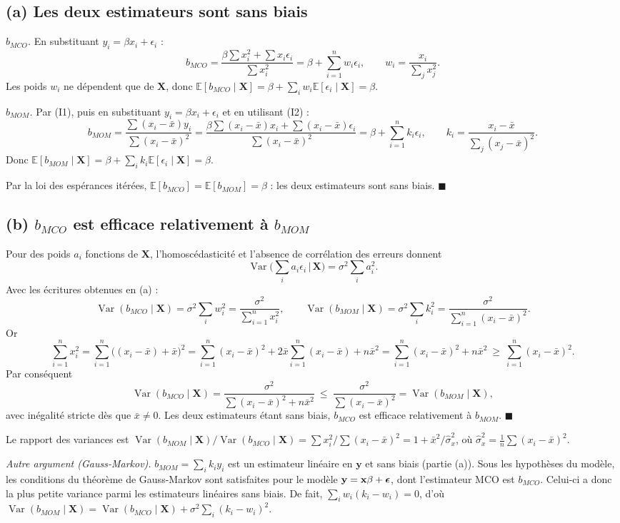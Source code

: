 \documentclass[11pt,a4paper]{article}
\newcommand{\vy}{\mathbf{y}}\newcommand{\vX}{\mathbf{X}}\newcommand{\vZ}{\mathbf{Z}}
\newcommand{\vx}{\mathbf{x}}\newcommand{\ve}{\mathbf{e}}\newcommand{\vb}{\mathbf{b}}
\newcommand{\E}{\mathbb{E}}\newcommand{\Var}{\operatorname{Var}}\newcommand{\Cov}{\operatorname{Cov}}
\newcommand{\sumi}{\sum_{i=1}^{n}}
\begin{document}
\subsection*{(a) Les deux estimateurs sont sans biais}

\textit{$b_{MCO}$.} En substituant $y_i=\beta x_i+\epsilon_i$ :
\[
b_{MCO}=\frac{\beta\sum x_i^2+\sum x_i\epsilon_i}{\sum x_i^2}=\beta+\sumi w_i\epsilon_i,\qquad w_i=\frac{x_i}{\sum_j x_j^2}.
\]
Les poids $w_i$ ne dépendent que de $\vX$, donc $\E[b_{MCO}\mid\vX]=\beta+\sum_i w_i\E[\epsilon_i\mid\vX]=\beta$.

\textit{$b_{MOM}$.} Par (I1), puis en substituant $y_i=\beta x_i+\epsilon_i$ et en utilisant (I2) :
\[
b_{MOM}=\frac{\sum(x_i-\bar x)y_i}{\sum(x_i-\bar x)^2}=\frac{\beta\sum(x_i-\bar x)x_i+\sum(x_i-\bar x)\epsilon_i}{\sum(x_i-\bar x)^2}=\beta+\sumi k_i\epsilon_i,\qquad k_i=\frac{x_i-\bar x}{\sum_j(x_j-\bar x)^2}.
\]
Donc $\E[b_{MOM}\mid\vX]=\beta+\sum_i k_i\E[\epsilon_i\mid\vX]=\beta$.

Par la loi des espérances itérées, $\E[b_{MCO}]=\E[b_{MOM}]=\beta$ : les deux estimateurs sont sans biais. $\blacksquare$

\subsection*{(b) $b_{MCO}$ est efficace relativement à $b_{MOM}$}

Pour des poids $a_i$ fonctions de $\vX$, l'homoscédasticité et l'absence de corrélation des erreurs donnent
\[
\Var\Big(\sum_i a_i\epsilon_i\,\Big|\,\vX\Big)=\sigma^2\sum_i a_i^2 .
\]
Avec les écritures obtenues en (a) :
\[
\Var(b_{MCO}\mid\vX)=\sigma^2\sum_i w_i^2=\frac{\sigma^2}{\sumi x_i^2},\qquad
\Var(b_{MOM}\mid\vX)=\sigma^2\sum_i k_i^2=\frac{\sigma^2}{\sumi(x_i-\bar x)^2}.
\]
Or
\[
\sumi x_i^2=\sumi\big((x_i-\bar x)+\bar x\big)^2=\sumi(x_i-\bar x)^2+2\bar x\sumi(x_i-\bar x)+n\bar x^2=\sumi(x_i-\bar x)^2+n\bar x^2\ \ge\ \sumi(x_i-\bar x)^2 .
\]
Par conséquent
\[
\Var(b_{MCO}\mid\vX)=\frac{\sigma^2}{\sum(x_i-\bar x)^2+n\bar x^2}\ \le\ \frac{\sigma^2}{\sum(x_i-\bar x)^2}=\Var(b_{MOM}\mid\vX),
\]
avec inégalité stricte dès que $\bar x\ne0$. Les deux estimateurs étant sans biais, $b_{MCO}$ est efficace relativement à $b_{MOM}$. $\blacksquare$

Le rapport des variances est $\Var(b_{MOM}\mid\vX)/\Var(b_{MCO}\mid\vX)=\sum x_i^2/\sum(x_i-\bar x)^2=1+\bar x^2/\hat\sigma_x^2$, où $\hat\sigma_x^2=\frac1n\sum(x_i-\bar x)^2$.

\textit{Autre argument (Gauss-Markov).} $b_{MOM}=\sum_i k_iy_i$ est un estimateur linéaire en $\vy$ et sans biais (partie (a)). Sous les hypothèses du modèle, les conditions du théorème de Gauss-Markov sont satisfaites pour le modèle $\vy=\vx\beta+\veps$, dont l'estimateur MCO est $b_{MCO}$. Celui-ci a donc la plus petite variance parmi les estimateurs linéaires sans biais. De fait, $\sum_i w_i(k_i-w_i)=0$, d'où $\Var(b_{MOM}\mid\vX)=\Var(b_{MCO}\mid\vX)+\sigma^2\sum_i(k_i-w_i)^2$.
\end{document}
